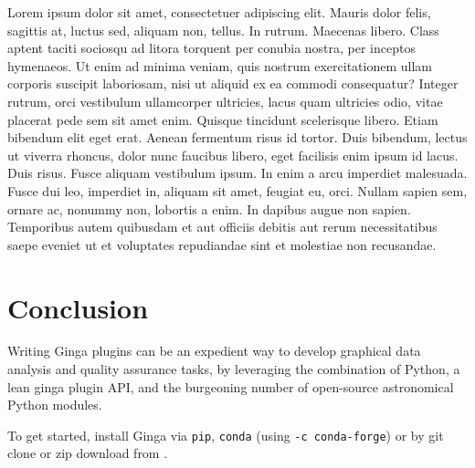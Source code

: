 \documentclass[]{article}
\begin{document}
\begin{multicols}{3}
\para
Lorem ipsum dolor sit amet, consectetuer adipiscing elit. Mauris dolor
felis, sagittis at, luctus sed, aliquam non, tellus. In rutrum. Maecenas
libero. Class aptent taciti sociosqu ad litora torquent per conubia
nostra, per inceptos hymenaeos. Ut enim ad minima veniam, quis nostrum
exercitationem ullam corporis suscipit laboriosam, nisi ut aliquid ex ea
commodi consequatur? Integer rutrum, orci vestibulum ullamcorper
ultricies, lacus quam ultricies odio, vitae placerat pede sem sit amet
enim. Quisque tincidunt scelerisque libero. Etiam bibendum elit eget
erat. Aenean fermentum risus id tortor. Duis bibendum, lectus ut viverra
rhoncus, dolor nunc faucibus libero, eget facilisis enim ipsum id
lacus. Duis risus. Fusce aliquam vestibulum ipsum. In enim a arcu
imperdiet malesuada. Fusce dui leo, imperdiet in, aliquam sit amet,
feugiat eu, orci. Nullam sapien sem, ornare ac, nonummy non, lobortis a
enim. In dapibus augue non sapien. Temporibus autem quibusdam et aut
officiis debitis aut rerum necessitatibus saepe eveniet ut et voluptates
repudiandae sint et molestiae non recusandae. 

\section*{Conclusion}

Writing Ginga plugins can be an expedient way to develop graphical data
analysis and quality assurance tasks, by leveraging the combination of
Python, a lean ginga plugin API, and the burgeoning number of open-source
astronomical Python modules.

To get started, install Ginga via {\tt pip},
{\tt conda} (using {\tt -c conda-forge}) or by git clone or zip download
from \cite{ginga}.  




\end{multicols}
\end{document}
